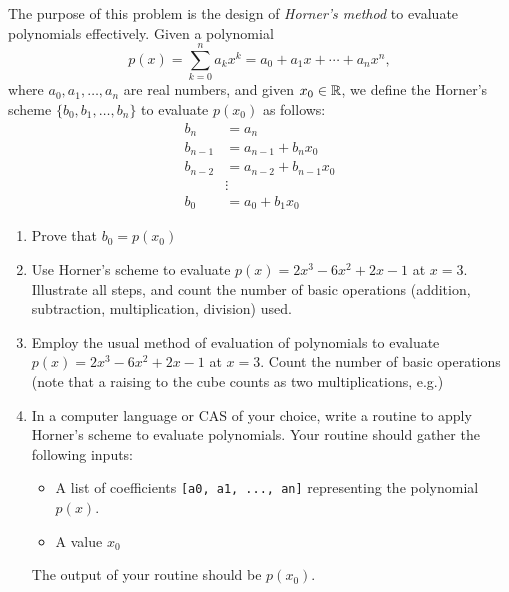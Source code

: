 \begin{problem}[CAS]
The purpose of this problem is the design of \emph{Horner's method} to evaluate polynomials effectively.  Given a polynomial
\begin{equation*}
p(x) = \sum_{k=0}^n a_k x^k = a_0 + a_1 x + \dotsb + a_n x^n,
\end{equation*}
where $a_0, a_1, \dotsc, a_n$ are real numbers, and given $x_0 \in \mathbb{R}$, we define the Horner's scheme $\{ b_0, b_1, \dotsc, b_n \}$ to evaluate $p(x_0)$ as follows:
\begin{align*}
b_n &= a_n \\
b_{n-1} &= a_{n-1} + b_n x_0 \\
b_{n-2} &= a_{n-2} + b_{n-1} x_0 \\
&\vdots \\
b_0 &= a_0 + b_1 x_0
\end{align*}
\begin{enumerate}
	\item Prove that $b_0 = p(x_0)$
	\item Use Horner's scheme to evaluate $p(x) = 2x^3 - 6x^2 +2x -1$ at $x=3$.  Illustrate all steps, and count the number of basic operations (addition, subtraction, multiplication, division) used.
	\item Employ the usual method of evaluation of polynomials to evaluate $p(x) = 2x^3 - 6x^2 +2x -1$ at $x=3$.  Count the number of basic operations (note that a raising to the cube counts as two multiplications, e.g.)
	\item In a computer language or CAS of your choice, write a routine to apply Horner's scheme to evaluate polynomials.  Your routine should gather the following inputs:
	\begin{itemize}
		\item A list of coefficients \texttt{[a0, a1, ..., an]} representing the polynomial $p(x)$.
		\item A value $x_0$
	\end{itemize}
	The output of your routine should be $p(x_0)$.
\end{enumerate}
\end{problem}

